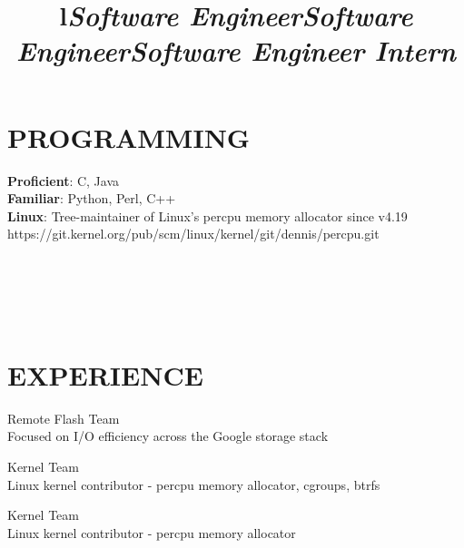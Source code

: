 \documentclass[margin,11pt]{res}
\begin{document}
\begin{resume}
\section{PROGRAMMING}

\textbf{Proficient}: C, Java\\
\textbf{Familiar}: Python, Perl, C++\\
\textbf{Linux}: Tree-maintainer of Linux's percpu memory allocator since v4.19\\
https://git.kernel.org/pub/scm/linux/kernel/git/dennis/percpu.git

\begin{format}
\\
\title{l}\\
\body\\
\end{format}

\section{EXPERIENCE}
\title{\sl{Software Engineer}}
\begin{position}
Remote Flash Team\\
Focused on I/O efficiency across the Google storage stack
\end{position}

\title{\sl{Software Engineer}}
\begin{position}
Kernel Team\\
Linux kernel contributor - percpu memory allocator, cgroups, btrfs
\end{position}

\title{\sl{Software Engineer Intern}}
\begin{position}
Kernel Team\\
Linux kernel contributor - percpu memory allocator
\end{position}


\end{resume}
\end{document}
